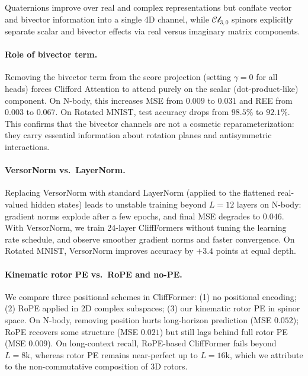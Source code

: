 \documentclass{article}
\theoremstyle{plain}
\theoremstyle{definition}
\theoremstyle{remark}
\newcommand{\cliff}{\mathcal{Cl}}
\begin{document}
Quaternions improve over real and complex representations but conflate vector and bivector information into a single 4D channel, while $\cliff_{3,0}$ spinors explicitly separate scalar and bivector effects via real versus imaginary matrix components.

\paragraph{Role of bivector term.}
Removing the bivector term from the score projection (setting $\gamma=0$ for all heads) forces Clifford Attention to attend purely on the scalar (dot-product-like) component. On N-body, this increases MSE from $0.009$ to $0.031$ and REE from $0.003$ to $0.067$. On Rotated MNIST, test accuracy drops from $98.5\%$ to $92.1\%$. This confirms that the bivector channels are not a cosmetic reparameterization: they carry essential information about rotation planes and antisymmetric interactions.

\paragraph{VersorNorm vs.\ LayerNorm.}
Replacing VersorNorm with standard LayerNorm (applied to the flattened real-valued hidden states) leads to unstable training beyond $L=12$ layers on N-body: gradient norms explode after a few epochs, and final MSE degrades to $0.046$. With VersorNorm, we train 24-layer CliffFormers without tuning the learning rate schedule, and observe smoother gradient norms and faster convergence. On Rotated MNIST, VersorNorm improves accuracy by $+3.4$ points at equal depth.

\paragraph{Kinematic rotor PE vs.\ RoPE and no-PE.}
We compare three positional schemes in CliffFormer: (1) no positional encoding; (2) RoPE applied in 2D complex subspaces; (3) our kinematic rotor PE in spinor space. On N-body, removing position hurts long-horizon prediction (MSE $0.052$); RoPE recovers some structure (MSE $0.021$) but still lags behind full rotor PE (MSE $0.009$). On long-context recall, RoPE-based CliffFormer fails beyond $L=8\mathrm{k}$, whereas rotor PE remains near-perfect up to $L=16\mathrm{k}$, which we attribute to the non-commutative composition of 3D rotors.

\end{document}
